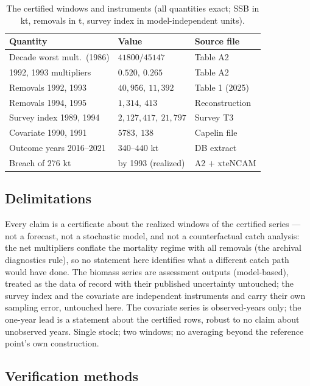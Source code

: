 \documentclass[10pt,twocolumn]{article}
\theoremstyle{plain}
\theoremstyle{remark}
\begin{document}
\begin{table}[t]
\centering
\scriptsize
\setlength{\tabcolsep}{3.5pt}
\caption{The certified windows and instruments (all quantities exact;
SSB in kt, removals in t, survey index in model-independent units).}
\label{tab:summary}
\begin{tabular}{@{}l l l@{}}
\toprule
Quantity & Value & Source file \\
\midrule
Decade worst mult.\ (1986) & \(41800/45147\) & Table A2 \\
1992, 1993 multipliers & \(0.520,\ 0.265\) & Table A2 \\
Removals 1992, 1993 & \(40{,}956,\ 11{,}392\) & Table 1 (2025) \\
Removals 1994, 1995 & \(1{,}314,\ 413\) & Reconstruction \\
Survey index 1989, 1994 & \(2{,}127{,}417,\ 21{,}797\) & Survey T3 \\
Covariate 1990, 1991 & \(5783,\ 138\) & Capelin file \\
Outcome years 2016--2021 & \(340\)--\(440\) kt & DB extract \\
Breach of \(276\) kt & by 1993 (realized) & A2 \(+\) xteNCAM \\
\bottomrule
\end{tabular}
\end{table}

\subsection{Delimitations}\label{scope}

Every claim is a certificate about the realized windows of the
certified series --- not a forecast, not a stochastic model, and not a
counterfactual catch analysis: the net multipliers conflate the
mortality regime with all removals (the archival diagnostics rule), so
no statement here identifies what a different catch path would have
done. The biomass series are assessment outputs (model-based), treated
as the data of record with their published uncertainty untouched; the
survey index and the covariate are independent instruments and carry
their own sampling error, untouched here. The covariate series is
observed-years only; the one-year lead is a statement about the
certified rows, robust to no claim about unobserved years. Single
stock; two windows; no averaging beyond the reference point's own
construction.

\subsection{Verification methods}\label{methods}
\end{document}
